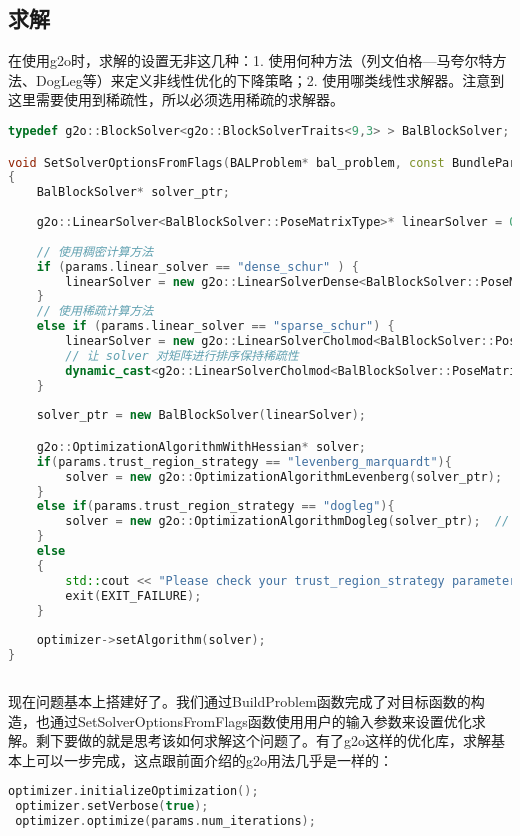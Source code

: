 \subsection{求解}
在使用g2o时，求解的设置无非这几种：1. 使用何种方法（列文伯格—马夸尔特方法、DogLeg等）来定义非线性优化的下降策略；2. 使用哪类线性求解器。注意到这里需要使用到稀疏性，所以必须选用稀疏的求解器。

\begin{lstlisting}[language=c++,caption=slambook/ch10/g2o_custombundle/g2o_bundle.cpp（片段）]
typedef g2o::BlockSolver<g2o::BlockSolverTraits<9,3> > BalBlockSolver;

void SetSolverOptionsFromFlags(BALProblem* bal_problem, const BundleParams& params, g2o::SparseOptimizer* optimizer)
{   
	BalBlockSolver* solver_ptr;
		
	g2o::LinearSolver<BalBlockSolver::PoseMatrixType>* linearSolver = 0;
	
	// 使用稠密计算方法
	if (params.linear_solver == "dense_schur" ) {
		linearSolver = new g2o::LinearSolverDense<BalBlockSolver::PoseMatrixType>();
	}
	// 使用稀疏计算方法
	else if (params.linear_solver == "sparse_schur") {
		linearSolver = new g2o::LinearSolverCholmod<BalBlockSolver::PoseMatrixType>();
		// 让 solver 对矩阵进行排序保持稀疏性
		dynamic_cast<g2o::LinearSolverCholmod<BalBlockSolver::PoseMatrixType>* >(linearSolver)->setBlockOrdering(true);  
	}
	
	solver_ptr = new BalBlockSolver(linearSolver);

	g2o::OptimizationAlgorithmWithHessian* solver;  
	if(params.trust_region_strategy == "levenberg_marquardt"){
		solver = new g2o::OptimizationAlgorithmLevenberg(solver_ptr);  // 使用列文伯格—马夸尔特下降法
	}
	else if(params.trust_region_strategy == "dogleg"){
		solver = new g2o::OptimizationAlgorithmDogleg(solver_ptr);  // 使用 DogLeg 下降法
	}
	else 
	{
		std::cout << "Please check your trust_region_strategy parameter again.."<< std::endl;
		exit(EXIT_FAILURE);
	}
	
	optimizer->setAlgorithm(solver);
}
	
\end{lstlisting}

现在问题基本上搭建好了。我们通过BuildProblem函数完成了对目标函数的构造，也通过SetSolverOptionsFromFlags函数使用用户的输入参数来设置优化求解。剩下要做的就是思考该如何求解这个问题了。有了g2o这样的优化库，求解基本上可以一步完成，这点跟前面介绍的g2o用法几乎是一样的：

\begin{lstlisting}[language=c++,caption=slambook/ch10/g2o_custombundle/g2o_bundle.cpp（片段）]
 optimizer.initializeOptimization();
 optimizer.setVerbose(true);
 optimizer.optimize(params.num_iterations);
\end{lstlisting}


